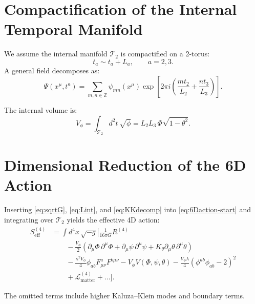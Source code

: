 \documentclass[12pt]{article}
\begin{document}

\newpage
\section{Compactification of the Internal Temporal Manifold}

We assume the internal manifold \(\mathcal{T}_2\) is compactified on a 2-torus:
\[
t_a \sim t_a + L_a, \qquad a=2,3.
\]
A general field decomposes as:
\begin{equation}
\Psi(x^\mu, t^a)
=
\sum_{m,n\in\mathbb{Z}}
\psi_{mn}(x^\mu)
\exp\left[
2\pi i\left(\frac{mt_2}{L_2} + \frac{nt_3}{L_3}\right)
\right].
\label{eq:KKdecomp}
\end{equation}

The internal volume is:
\begin{equation}
V_\phi 
= \int_{\mathcal{T}_2} d^2t\, \sqrt{\phi}
= L_2 L_3\, \Phi\sqrt{1-\theta^2}.
\label{eq:Vphi}
\end{equation}


\newpage
\section{Dimensional Reduction of the 6D Action}

Inserting \eqref{eq:sqrtG}, \eqref{eq:Lint}, and \eqref{eq:KKdecomp} into
\eqref{eq:6Daction-start} and integrating over \(\mathcal{T}_2\) yields the
effective 4D action:
\begin{align}
S_{\text{eff}}^{(4)}
&=
\int d^4x\,\sqrt{-g}
\Bigg[
\frac{1}{16\pi G}R^{(4)}
\nonumber\\
&\qquad
- \frac{V_\phi}{2}
\left(
\partial_\mu\Phi\,\partial^\mu\Phi
+ \partial_\mu\psi\,\partial^\mu\psi
+ K_\theta \partial_\mu\theta\,\partial^\mu\theta
\right)
\nonumber\\
&\qquad
- \frac{\kappa^2 V_\phi}{4}\phi_{ab}F^a_{\mu\nu}F^{b\mu\nu}
- V_\phi V(\Phi,\psi,\theta)
- \frac{V_\phi\lambda}{4}\left(\phi^{ab}\phi_{ab} - 2\right)^2
\nonumber\\
&\qquad
+ \mathcal{L}_{\text{matter}}^{(4)}
+ \dots
\Bigg].
\label{eq:Seff4D}
\end{align}

The omitted terms include higher Kaluza–Klein modes and boundary terms.

\end{document}
